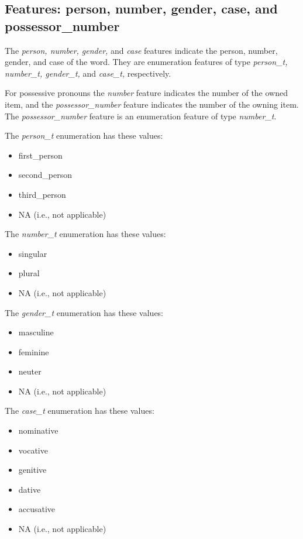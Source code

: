 \documentclass[11pt,oneside,a4paper]{memoir}
\begin{document}
\subsection{Features: person, number, gender, case, and possessor\_number}

The \emph{person, number, gender,} and \emph{case} features indicate the person, number, gender, and
case of the word. They are enumeration features of type \emph{person\_t, number\_t, gender\_t,} and
\emph{case\_t,} respectively.

For possessive pronouns the \emph{number} feature indicates the number of the owned item, and the
\emph{possessor\_number} feature indicates the number of the owning item. The
\emph{possessor\_number} feature is an enumeration feature of type \emph{number\_t}.


The \emph{person\_t} enumeration has these values:

\begin{itemize}
\item first\_person
\item second\_person
\item third\_person
\item NA (i.e., not applicable)
\end{itemize}

The \emph{number\_t} enumeration has these values:

\begin{itemize}
\item singular
\item plural
\item NA (i.e., not applicable)
\end{itemize}

The \emph{gender\_t} enumeration has these values:

\begin{itemize}
\item masculine
\item feminine
\item neuter
\item NA (i.e., not applicable)
\end{itemize}

The \emph{case\_t} enumeration has these values:

\begin{itemize}
\item nominative
\item vocative
\item genitive
\item dative
\item accusative
\item NA (i.e., not applicable)
\end{itemize}
\end{document}
